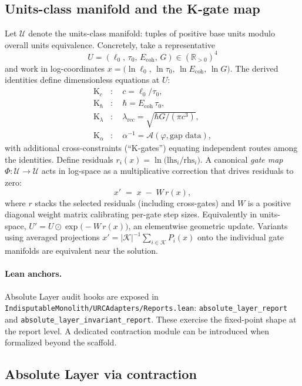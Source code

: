 \documentclass[11pt]{article}
\begin{document}
\subsection{Units\mbox{-}class manifold and the K\mbox{-}gate map}
Let \(\mathcal{U}\) denote the units\mbox{-}class manifold: tuples of positive base units modulo overall units equivalence. Concretely, take a representative
\[
  U=(\ell_0,\, \tau_0,\, E_{\mathrm{coh}},\, G)\in (\mathbb{R}_{>0})^4
\]
and work in log\mbox{-}coordinates \(x=\bigl(\ln \ell_0,\, \ln \tau_0,\, \ln E_{\mathrm{coh}},\, \ln G\bigr)\). The derived identities define dimensionless equations at \(U\):
\begin{align*}
  \mathrm{K}_c&:\quad c=\ell_0/\tau_0,\\
  \mathrm{K}_{\hbar}&:\quad \hbar=E_{\mathrm{coh}}\,\tau_0,\\
  \mathrm{K}_{\lambda}&:\quad \lambda_{\mathrm{rec}}=\sqrt{\hbar G/(\pi c^3)},\\
  \mathrm{K}_{\alpha}&:\quad \alpha^{-1}=\mathcal{A}(\varphi,\text{gap data}),
\end{align*}
with additional cross\mbox{-}constraints (``K\mbox{-}gates'') equating independent routes among the identities. Define residuals \(r_i(x)=\ln\bigl(\mathrm{lhs}_i/\mathrm{rhs}_i\bigr)\). A canonical \emph{gate map} \(\Phi\colon \mathcal{U}\to\mathcal{U}\) acts in log\mbox{-}space as a multiplicative correction that drives residuals to zero:
\[
  x'\;=\;x\; -\; W\, r(x),
\]
where \(r\) stacks the selected residuals (including cross\mbox{-}gates) and \(W\) is a positive diagonal weight matrix calibrating per\mbox{-}gate step sizes. Equivalently in units\mbox{-}space, \(U' = U\odot \exp\bigl(-W\, r(x)\bigr)\), an elementwise geometric update. Variants using averaged projections \(x' = |\mathcal{K}|^{-1}\sum_{i\in\mathcal{K}} P_i(x)\) onto the individual gate manifolds are equivalent near the solution.

\paragraph{Lean anchors.} Absolute Layer audit hooks are exposed in \texttt{IndisputableMonolith/URCAdapters/Reports.lean}: \texttt{absolute\_layer\_report} and \texttt{absolute\_layer\_invariant\_report}. These exercise the fixed\mbox{-}point shape at the report level. A dedicated contraction module can be introduced when formalized beyond the scaffold.

\subsection{Absolute Layer via contraction}\label{subsec:absolute}
\end{document}
